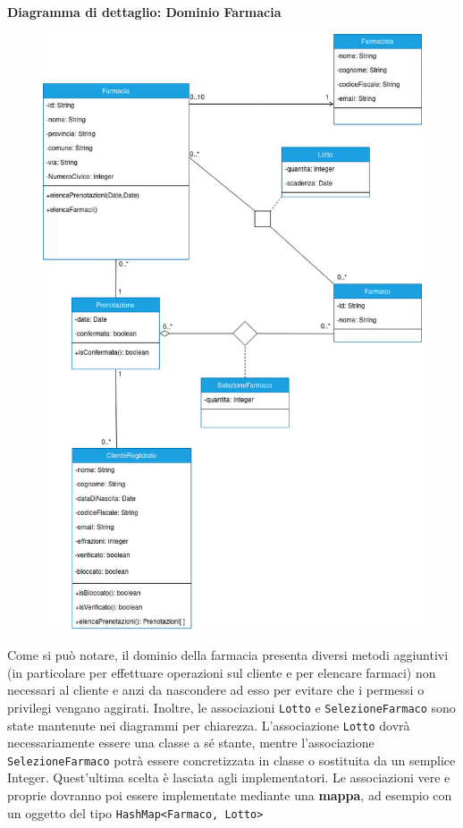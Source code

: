 \textbf{Diagramma di dettaglio: Dominio Farmacia}
\begin{figure}[h!]
    \begin{center}
        \includegraphics[scale=0.56]{immagini/DominioFarmacia-progettazione.jpg}
    \end{center}
\end{figure}

\newpage

Come si può notare, il dominio della farmacia presenta diversi metodi aggiuntivi (in particolare per effettuare operazioni sul cliente e per elencare farmaci)
non necessari al cliente e anzi da nascondere ad esso per evitare che i permessi o privilegi vengano aggirati.
Inoltre, le associazioni \texttt{Lotto} e \texttt{SelezioneFarmaco} sono state mantenute nei diagrammi per chiarezza.
L'associazione \texttt{Lotto} dovrà necessariamente essere una classe a sé stante,
mentre l'associazione \texttt{SelezioneFarmaco} potrà essere concretizzata in classe o sostituita da un semplice Integer. Quest'ultima scelta è lasciata agli implementatori.
Le associazioni vere e proprie dovranno poi essere implementate mediante una \textbf{mappa}, ad esempio con un oggetto del tipo \mbox{\texttt{HashMap<Farmaco, Lotto>}}
\vspace{2em}

